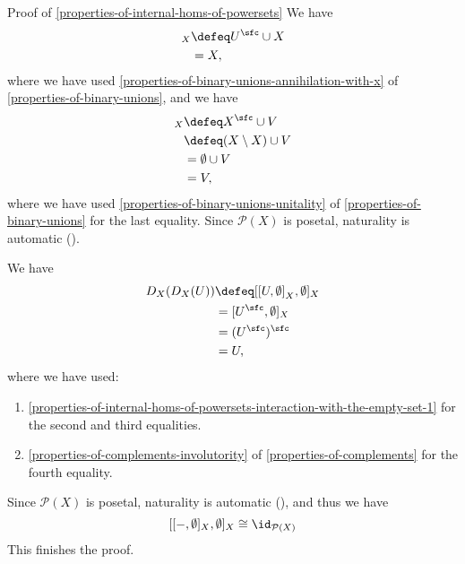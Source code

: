\begin{Proof}{Proof of \cref{properties-of-internal-homs-of-powersets}}
    We have
    \begin{align*}
        [U,X]_{X} &\defeq U^{\sfc}\cup X\\
                  &=      X,
    \end{align*}
    where we have used \cref{properties-of-binary-unions-annihilation-with-x} of \cref{properties-of-binary-unions}, and we have
    \begin{align*}
        [X,V]_{X} &\defeq X^{\sfc}\cup V\\
                  &\defeq (X\setminus X)\cup V\\
                  &=      \emptyset\cup V\\
                  &=      V,
    \end{align*}
    where we have used \cref{properties-of-binary-unions-unitality} of \cref{properties-of-binary-unions} for the last equality. Since $\mathcal{P}(X)$ is posetal, naturality is automatic ().

    We have
    \begin{align*}
        D_{X}(D_{X}(U)) &\defeq [[U,\emptyset]_{X},\emptyset]_{X}\\
                        &= [U^{\sfc},\emptyset]_{X}\\
                        &= (U^{\sfc})^{\sfc}\\
                        &= U,
    \end{align*}
    where we have used:
    \begin{enumerate}
        \item\label{proof-of-properties-of-internal-homs-of-powersets-interaction-with-the-empty-set-2-a}\cref{properties-of-internal-homs-of-powersets-interaction-with-the-empty-set-1} for the second and third equalities.
        \item\label{proof-of-properties-of-internal-homs-of-powersets-interaction-with-the-empty-set-2-b}\cref{properties-of-complements-involutority} of \cref{properties-of-complements} for the fourth equality.
    \end{enumerate}
    Since $\mathcal{P}(X)$ is posetal, naturality is automatic (), and thus we have
    \[
        [[-,\emptyset]_{X},\emptyset]_{X}%
        \cong%
        \id_{\mathcal{P}(X)}%
    \]%
    This finishes the proof.


\end{Proof}
